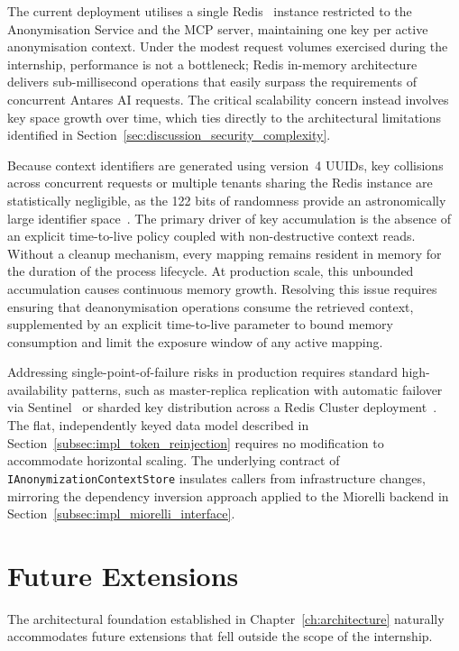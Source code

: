The current deployment utilises a single Redis~\cite{redis2009} instance restricted to the Anonymisation Service and the MCP server, maintaining one key per active anonymisation context. Under the modest request volumes exercised during the internship, performance is not a bottleneck; Redis in-memory architecture delivers sub-millisecond operations that easily surpass the requirements of concurrent Antares AI requests. The critical scalability concern instead involves key space growth over time, which ties directly to the architectural limitations identified in Section~\ref{sec:discussion_security_complexity}.

Because context identifiers are generated using version~4 UUIDs, key collisions across concurrent requests or multiple tenants sharing the Redis instance are statistically negligible, as the 122 bits of randomness provide an astronomically large identifier space~\cite{ietf2005uuid}. The primary driver of key accumulation is the absence of an explicit time-to-live policy coupled with non-destructive context reads. Without a cleanup mechanism, every mapping remains resident in memory for the duration of the process lifecycle. At production scale, this unbounded accumulation causes continuous memory growth. Resolving this issue requires ensuring that deanonymisation operations consume the retrieved context, supplemented by an explicit time-to-live parameter to bound memory consumption and limit the exposure window of any active mapping.

Addressing single-point-of-failure risks in production requires standard high-availability patterns, such as master-replica replication with automatic failover via Sentinel~\cite{redis2025sentinel} or sharded key distribution across a Redis Cluster deployment~\cite{redis2025cluster}. The flat, independently keyed data model described in Section~\ref{subsec:impl_token_reinjection} requires no modification to accommodate horizontal scaling. The underlying contract of \texttt{IAnonymizationContextStore} insulates callers from infrastructure changes, mirroring the dependency inversion approach applied to the Miorelli backend in Section~\ref{subsec:impl_miorelli_interface}.

\section{Future Extensions}
\label{sec:discussion_future_extensions}

The architectural foundation established in Chapter~\ref{ch:architecture} naturally accommodates future extensions that fell outside the scope of the internship.

